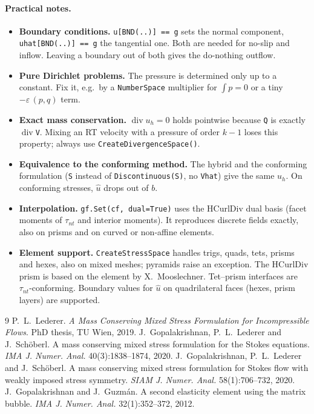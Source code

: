 \documentclass[10pt,a4paper]{article}
\newcommand{\code}[1]{\texttt{#1}}
\begin{document}
\paragraph{Practical notes.}
\begin{itemize}\setlength\itemsep{1pt}
\item \textbf{Boundary conditions.} \code{u[BND(..)] == g} sets the normal component, \code{uhat[BND(..)] == g} the tangential one. Both are needed for no-slip and inflow. Leaving a boundary out of both gives the do-nothing outflow.
\item \textbf{Pure Dirichlet problems.} The pressure is determined only up to a constant. Fix it, e.g.\ by a \code{NumberSpace} multiplier for $\int p = 0$ or a tiny $-\varepsilon\,(p,q)$ term.
\item \textbf{Exact mass conservation.} $\operatorname{div} u_h = 0$ holds pointwise because \code{Q} is exactly $\operatorname{div}$\code{V}. Mixing an RT velocity with a pressure of order $k-1$ loses this property; always use \code{CreateDivergenceSpace()}.
\item \textbf{Equivalence to the conforming method.} The hybrid and the conforming formulation (\code{S} instead of \code{Discontinuous(S)}, no \code{Vhat}) give the same $u_h$. On conforming stresses, $\hat u$ drops out of $b$.
\item \textbf{Interpolation.} \code{gf.Set(cf, dual=True)} uses the HCurlDiv dual basis (facet moments of $\tau_{nt}$ and interior moments). It reproduces discrete fields exactly, also on prisms and on curved or non-affine elements.
\item \textbf{Element support.} \code{CreateStressSpace} handles trigs, quads, tets, prisms and hexes, also on mixed meshes; pyramids raise an exception. The HCurlDiv prism is based on the element by X.~Mooslechner. Tet--prism interfaces are $\tau_{nt}$-conforming. Boundary values for $\hat u$ on quadrilateral faces (hexes, prism layers) are supported.
\end{itemize}

{\footnotesize\setlength{\itemsep}{0pt}
\begin{thebibliography}{9}\setlength{\itemsep}{1pt}
 P.~L.~Lederer. \emph{A Mass Conserving Mixed Stress Formulation for Incompressible Flows}. PhD thesis, TU Wien, 2019.
 J.~Gopalakrishnan, P.~L.~Lederer and J.~Sch\"oberl. A mass conserving mixed stress formulation for the Stokes equations. \emph{IMA J. Numer. Anal.} 40(3):1838--1874, 2020.
 J.~Gopalakrishnan, P.~L.~Lederer and J.~Sch\"oberl. A mass conserving mixed stress formulation for Stokes flow with weakly imposed stress symmetry. \emph{SIAM J. Numer. Anal.} 58(1):706--732, 2020.
 J.~Gopalakrishnan and J.~Guzm\'an. A second elasticity element using the matrix bubble. \emph{IMA J. Numer. Anal.} 32(1):352--372, 2012.
\end{thebibliography}}
\end{document}
